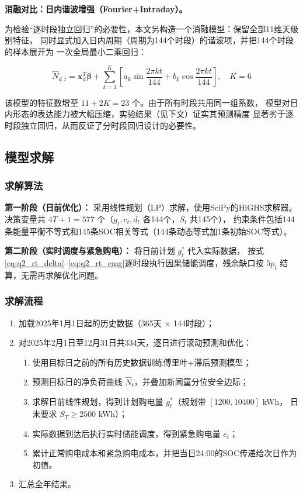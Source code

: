 \documentclass[12pt,a4paper]{article}
\begin{document}
\textbf{消融对比：日内谐波增强（Fourier+Intraday）。}

为检验“逐时段独立回归”的必要性，本文另构造一个消融模型：保留全部11维天级别特征，
同时显式加入日内周期（周期为144个时段）的谐波项，并把144个时段的样本展开为
一次全局最小二乘回归：

\begin{equation}
    \hat{N}_{d,t} = \mathbf{x}_d^T \boldsymbol{\beta}
        + \sum_{k=1}^{K}\left[a_k \sin\frac{2\pi k t}{144} + b_k \cos\frac{2\pi k t}{144}\right],
        \quad K = 6
\end{equation}

该模型的特征数增至 $11 + 2K = 23$ 个。由于所有时段共用同一组系数，
模型对日内形态的表达能力被大幅压缩，实验结果（见下文）证实其预测精度
显著劣于逐时段独立回归，从而反证了分时段回归设计的必要性。

\subsection{模型求解}

\subsubsection{求解算法}

\textbf{第一阶段（日前优化）：} 采用线性规划（LP）求解，使用SciPy的HiGHS求解器。
决策变量共 $4T + 1 = 577$ 个（$g_t, c_t, d_t$ 各144个，$S_t$ 共145个），
约束条件包括144条能量平衡不等式和145条SOC相关等式（144条动态等式加1条初始SOC等式）。

\textbf{第二阶段（实时调度与紧急购电）：} 将日前计划 $g_t^*$ 代入实际数据，
按式\eqref{eq:q2_rt_delta}--\eqref{eq:q2_rt_emg}逐时段执行因果储能调度，残余缺口按 $5p_t$ 结算，无需再求解优化问题。

\subsubsection{求解流程}

\begin{enumerate}
    \item 加载2025年1月1日起的历史数据（365天 $\times$ 144时段）；
    \item 对2025年2月1日至12月31日共334天，逐日进行滚动预测和优化：
    \begin{enumerate}
        \item 使用目标日之前的所有历史数据训练傅里叶+滞后预测模型；
        \item 预测目标日的净负荷曲线 $\hat{N}_t$，并叠加新闻童分位安全边际；
        \item 求解日前线性规划，得到计划购电量 $g_t^*$（规划带 $[1200, 10400]$ kWh，
              日末要求 $S_T \geq 2500$ kWh）；
        \item 实际数据到达后执行实时储能调度，得到紧急购电量 $e_t$；
        \item 累计正常购电成本和紧急购电成本，并把当日24:00的SOC传递给次日作为初值。
    \end{enumerate}
    \item 汇总全年结果。
\end{enumerate}
\end{document}
